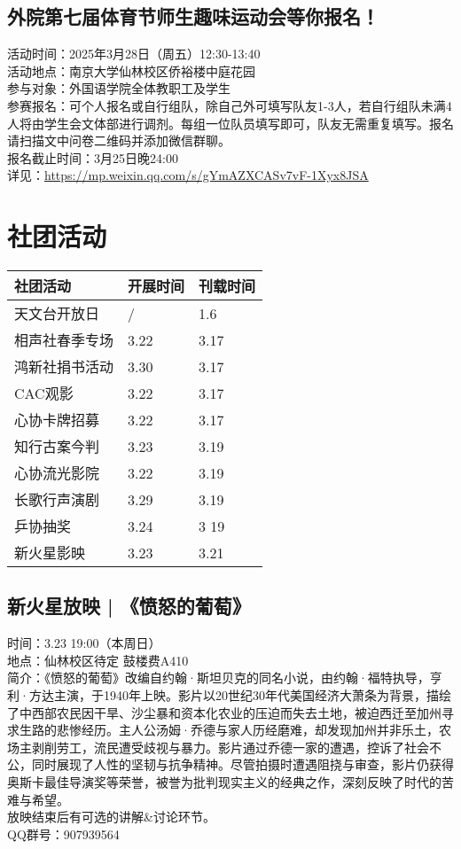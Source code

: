 \documentclass[letterpaper, 12pt]{article}
\begin{document}
\begin{multicols}{2}
\subsection{外院第七届体育节师生趣味运动会等你报名！}
活动时间：2025年3月28日（周五）12:30-13:40
\\活动地点：南京大学仙林校区侨裕楼中庭花园
\\参与对象：外国语学院全体教职工及学生
\\参赛报名：可个人报名或自行组队，除自己外可填写队友1-3人，若自行组队未满4人将由学生会文体部进行调剂。每组一位队员填写即可，队友无需重复填写。报名请扫描文中问卷二维码并添加微信群聊。
\\报名截止时间：3月25日晚24:00
\\详见：\url{https://mp.weixin.qq.com/s/gYmAZXCASv7vF-1Xyx8JSA}
\section{社团活动}
\begin{tabular}{|>{\centering\arraybackslash}m{}|m{}|m{}|}
    \hline
    社团活动 & 开展时间 & 刊载时间\\
    \hline\hline
    天文台开放日 & / & 1.6\\
    相声社春季专场 & 3.22 & 3.17\\
    鸿新社捐书活动 & 3.30 & 3.17\\
    CAC观影 & 3.22 & 3.17\\
    心协卡牌招募 & 3.22 & 3.17\\
    知行古案今判 & 3.23 & 3.19\\
    心协流光影院 & 3.22 & 3.19\\
    长歌行声演剧 & 3.29 & 3.19\\
    乒协抽奖 & 3.24 & 3 19\\
    新火星影映 & 3.23 & 3.21\\
    \hline
\end{tabular}
\subsection{新火星放映 | 《愤怒的葡萄》}
时间：3.23 19:00（本周日）\\
地点：仙林校区待定 鼓楼费A410\\
简介：《愤怒的葡萄》改编自约翰·斯坦贝克的同名小说，由约翰·福特执导，亨利·方达主演，于1940年上映。影片以20世纪30年代美国经济大萧条为背景，描绘了中西部农民因干旱、沙尘暴和资本化农业的压迫而失去土地，被迫西迁至加州寻求生路的悲惨经历。主人公汤姆·乔德与家人历经磨难，却发现加州并非乐土，农场主剥削劳工，流民遭受歧视与暴力。影片通过乔德一家的遭遇，控诉了社会不公，同时展现了人性的坚韧与抗争精神。尽管拍摄时遭遇阻挠与审查，影片仍获得奥斯卡最佳导演奖等荣誉，被誉为批判现实主义的经典之作，深刻反映了时代的苦难与希望。\\
放映结束后有可选的讲解\&讨论环节。\\
QQ群号：907939564\\


\end{multicols}
\end{document}
